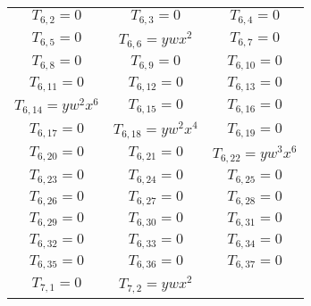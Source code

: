 \documentclass[12pt]{memoireuqam1.3}
\begin{document}
\begin{longtable}{|c|c|c|}
$T_{6,2}= 0$&

$T_{6,3}= 0$&

$T_{6,4}= 0$\\

$T_{6,5}= 0$&

$T_{6,6}= ywx^2$&

$T_{6,7}= 0$\\

$T_{6,8}= 0$&

$T_{6,9}= 0$&

$T_{6,10}= 0$\\

$T_{6,11}= 0$&

$T_{6,12}= 0$&

$T_{6,13}= 0$\\

$T_{6,14}= yw^2x^6$&

$T_{6,15}= 0$&

$T_{6,16}= 0$\\

$T_{6,17}= 0$&

$T_{6,18}= yw^2x^4$&

$T_{6,19}= 0$\\

$T_{6,20}= 0$&

$T_{6,21}= 0$&

$T_{6,22}= yw^3x^6$\\

$T_{6,23}= 0$&

$T_{6,24}= 0$&

$T_{6,25}= 0$\\

$T_{6,26}= 0$&

$T_{6,27}= 0$&

$T_{6,28}= 0$\\

$T_{6,29}= 0$&

$T_{6,30}= 0$&

$T_{6,31}= 0$\\

$T_{6,32}= 0$&

$T_{6,33}= 0$&

$T_{6,34}= 0$\\

$T_{6,35}= 0$&

$T_{6,36}= 0$&

$T_{6,37}= 0$\\

$T_{7,1}= 0$&

$T_{7,2}= ywx^2$&


\end{longtable}
\end{document}
